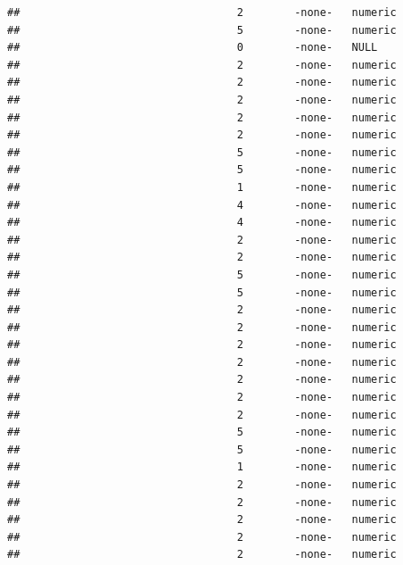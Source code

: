 \documentclass[
  12pt,
]{article}
\begin{document}
\begin{verbatim}
##                                  2        -none-   numeric                    
##                                  5        -none-   numeric                    
##                                  0        -none-   NULL                       
##                                  2        -none-   numeric                    
##                                  2        -none-   numeric                    
##                                  2        -none-   numeric                    
##                                  2        -none-   numeric                    
##                                  2        -none-   numeric                    
##                                  5        -none-   numeric                    
##                                  5        -none-   numeric                    
##                                  1        -none-   numeric                    
##                                  4        -none-   numeric                    
##                                  4        -none-   numeric                    
##                                  2        -none-   numeric                    
##                                  2        -none-   numeric                    
##                                  5        -none-   numeric                    
##                                  5        -none-   numeric                    
##                                  2        -none-   numeric                    
##                                  2        -none-   numeric                    
##                                  2        -none-   numeric                    
##                                  2        -none-   numeric                    
##                                  2        -none-   numeric                    
##                                  2        -none-   numeric                    
##                                  2        -none-   numeric                    
##                                  5        -none-   numeric                    
##                                  5        -none-   numeric                    
##                                  1        -none-   numeric                    
##                                  2        -none-   numeric                    
##                                  2        -none-   numeric                    
##                                  2        -none-   numeric                    
##                                  2        -none-   numeric                    
##                                  2        -none-   numeric                    

\end{verbatim}
\end{document}
